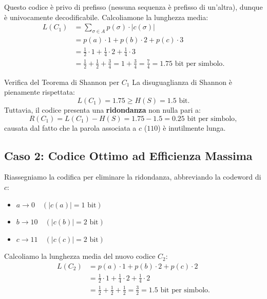 Questo codice \`e privo di prefisso (nessuna sequenza \`e prefisso di un'altra), dunque \`e univocamente decodificabile. Calcoliamone la lunghezza media:
\begin{align}
  L(C_1) &= \sum_{\sigma \in A} p(\sigma) \cdot |c(\sigma)| \nonumber \\
  &= p(a) \cdot 1 + p(b) \cdot 2 + p(c) \cdot 3 \nonumber \\
  &= \frac{1}{2} \cdot 1 + \frac{1}{4} \cdot 2 + \frac{1}{4} \cdot 3 \nonumber \\
  &= \frac{1}{2} + \frac{1}{2} + \frac{3}{4} = 1 + \frac{3}{4} = \frac{7}{4} = 1.75 \text{ bit per simbolo}.
\end{align}

\begin{noteblock}{Verifica del Teorema di Shannon per $C_1$}
La disuguaglianza di Shannon \`e pienamente rispettata:
\begin{equation}
  L(C_1) = 1.75 \ge H(S) = 1.5 \text{ bit}.
\end{equation}
Tuttavia, il codice presenta una \textbf{ridondanza} non nulla pari a:
\begin{equation}
  R(C_1) = L(C_1) - H(S) = 1.75 - 1.5 = 0.25 \text{ bit per simbolo},
\end{equation}
causata dal fatto che la parola associata a $c$ ($110$) \`e inutilmente lunga.
\end{noteblock}

\FloatBarrier
\subsection{Caso 2: Codice Ottimo ad Efficienza Massima}
\label{subsec:caso-2-ottimo}

Riassegniamo la codifica per eliminare la ridondanza, abbreviando la codeword di $c$:
\begin{itemize}
  \item $a \to 0 \quad (|c(a)| = 1 \text{ bit})$
  \item $b \to 10 \quad (|c(b)| = 2 \text{ bit})$
  \item $c \to 11 \quad (|c(c)| = 2 \text{ bit})$
\end{itemize}

Calcoliamo la lunghezza media del nuovo codice $C_2$:
\begin{align}
  L(C_2) &= p(a) \cdot 1 + p(b) \cdot 2 + p(c) \cdot 2 \nonumber \\
  &= \frac{1}{2} \cdot 1 + \frac{1}{4} \cdot 2 + \frac{1}{4} \cdot 2 \nonumber \\
  &= \frac{1}{2} + \frac{1}{2} + \frac{1}{2} = \frac{3}{2} = 1.5 \text{ bit per simbolo}.
\end{align}


